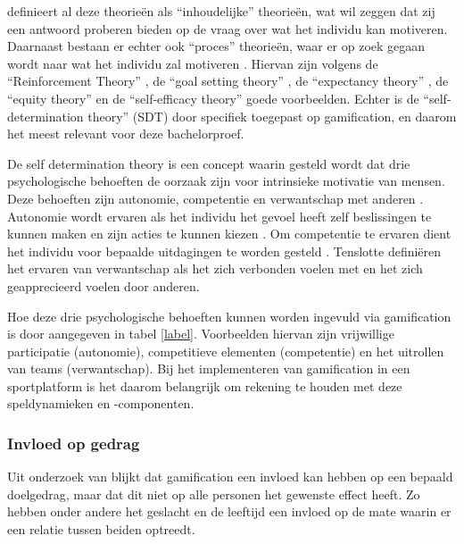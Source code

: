 
\textcite{Kispál-Vitai2013} definieert al deze theorieën als “inhoudelijke” theorieën, wat wil zeggen dat zij een antwoord proberen bieden op de vraag over wat het individu kan motiveren. Daarnaast bestaan er echter ook “proces” theorieën, waar er op zoek gegaan wordt naar wat het individu zal motiveren \autocite{Robbins2011}. Hiervan zijn volgens \textcite{Benke2019} de “Reinforcement Theory” \autocite{Skinner1954}, de “goal setting theory” \autocite{Locke1968}, de “expectancy theory” \autocite{Vroom1964}, de “equity theory” \autocite{Adams1963} en de “self-efficacy theory” \autocite{Bandura1977} goede voorbeelden. Echter is de “self-determination theory” (SDT) \autocite{DeciAndRyan1985} door \textcite{KamAndUmar2018} specifiek toegepast op gamification, en daarom het meest relevant voor deze bachelorproef. 

De self determination theory is een concept waarin gesteld wordt dat drie psychologische behoeften de oorzaak zijn voor intrinsieke motivatie van mensen. Deze behoeften zijn autonomie, competentie en verwantschap met anderen \autocite{DeciAndRyan2000}. 
Autonomie wordt ervaren als het individu het gevoel heeft zelf beslissingen te kunnen maken en zijn acties te kunnen kiezen \autocite{DeciAndRyan1985}.
Om competentie te ervaren dient het individu voor bepaalde uitdagingen te worden gesteld \autocite{KamAndUmar2018}. Tenslotte definiëren \textcite{KamAndUmar2018} het ervaren van verwantschap als het zich verbonden voelen met en het zich geapprecieerd voelen door anderen.

Hoe deze drie psychologische behoeften kunnen worden ingevuld via gamification is door \textcite{KamAndUmar2018} aangegeven in tabel \ref{label}. Voorbeelden hiervan zijn vrijwillige participatie (autonomie), competitieve elementen (competentie) en het uitrollen van teams (verwantschap). Bij het implementeren van gamification in een sportplatform is het daarom belangrijk om rekening te houden met deze speldynamieken en -componenten.

\subsubsection{Invloed op gedrag}
Uit onderzoek van \textcite{Hamari2013a} blijkt dat gamification een invloed kan hebben op een bepaald doelgedrag, maar dat dit niet op alle personen het gewenste effect heeft. Zo hebben onder andere het geslacht en de leeftijd een invloed op de mate waarin er een relatie tussen beiden optreedt.

